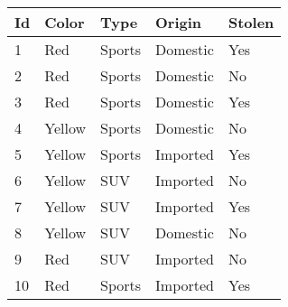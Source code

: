 \documentclass[11pt,a4paper]{article}
\theoremstyle{definition}%
\begin{document}
\begin{center}
\begin{tabular}{|l|l|l|l|l|}
\hline
\textbf{Id} & \textbf{Color} & \textbf{Type} & \textbf{Origin} & \textbf{Stolen} \\ \hline
1           & Red            & Sports        & Domestic        & Yes             \\ \hline
2           & Red            & Sports        & Domestic        & No              \\ \hline
3           & Red            & Sports        & Domestic        & Yes             \\ \hline
4           & Yellow         & Sports        & Domestic        & No              \\ \hline
5           & Yellow         & Sports        & Imported        & Yes             \\ \hline
6           & Yellow         & SUV           & Imported        & No              \\ \hline
7           & Yellow         & SUV           & Imported        & Yes             \\ \hline
8           & Yellow         & SUV           & Domestic        & No              \\ \hline
9           & Red            & SUV           & Imported        & No              \\ \hline
10          & Red            & Sports        & Imported        & Yes             \\ \hline
\end{tabular}
\end{center}
\end{document}
